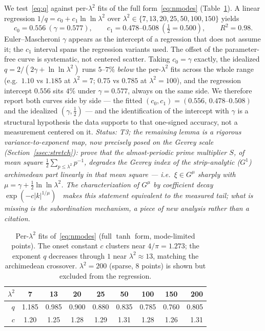 \documentclass[11pt,a4paper]{article}
\begin{document}
We test~\eqref{eq:q} against per-$\lambda^2$ fits of the full
form~\eqref{eq:nmodes} (Table~\ref{tab:q}). A linear regression
$1/q=c_0+c_1\ln\ln\lambda^2$ over $\lambda^2\in\{7,13,20,25,50,100,150\}$ yields
\[
  c_0=0.556\ (\gamma=0.577),\qquad c_1=0.478\text{--}0.508\ (\tfrac12=0.500),
  \qquad R^2=0.98 .
\]
Euler--Mascheroni $\gamma$ appears as the intercept of a regression that does
not assume it; the $c_1$ interval spans the regression variants used. The
offset of the parameter-free curve is systematic, not centered scatter.
Taking $c_0=\gamma$ exactly,
the idealized $q=2/(2\gamma+\ln\ln\lambda^2)$ runs $5$--$7\%$ \emph{below} the
per-$\lambda^2$ fits across the whole range (e.g.\ $1.10$ vs $1.185$ at
$\lambda^2=7$; $0.75$ vs $0.785$ at $\lambda^2=100$), and the regression
intercept $0.556$ sits $4\%$ under $\gamma=0.577$, always on the same side. We
therefore report both curves side by side --- the fitted
$(c_0,c_1)=(0.556,\,0.478\text{--}0.508)$ and the idealized
$(\gamma,\tfrac12)$ --- and the identification of the intercept with $\gamma$
is a structural hypothesis the data supports to that one-signed accuracy, not
a measurement centered on it. \emph{Status: T3; the remaining lemma is a rigorous
variance-to-exponent map, now precisely posed on the Gevrey scale
(Section~\ref{ssec:stretch}): prove that the almost-periodic prime multiplier
$S$, of mean square $\tfrac12\sum_{p\le\lambda^2}p^{-1}$, degrades the Gevrey
index of the strip-analytic ($G^1$) archimedean part linearly in that mean
square --- i.e.\ $\xi\in G^{\mu}$ sharply with
$\mu=\gamma+\tfrac12\ln\ln\lambda^2$. The characterization of $G^{\mu}$ by
coefficient decay $\exp(-c|k|^{1/\mu})$~\cite{Rodino1993} makes this statement
equivalent to the measured tail; what is missing is the subordination
mechanism, a piece of new analysis rather than a citation.}

\begin{table}[t]
\centering
\caption{Per-$\lambda^2$ fits of~\eqref{eq:nmodes} (full $\tanh$ form,
mode-limited points). The onset constant $c$ clusters near $4/\pi=1.273$; the
exponent $q$ decreases through $1$ near $\lambda^2\approx13$, matching the
archimedean crossover. $\lambda^2=200$ (sparse, $8$ points) is shown but
excluded from the regression.}
\label{tab:q}
\begin{tabular}{@{}rccccccc r@{}}
\toprule
$\lambda^2$ & 7 & 13 & 20 & 25 & 50 & 100 & 150 & 200 \\
\midrule
$q$ & 1.185 & 0.985 & 0.900 & 0.880 & 0.835 & 0.785 & 0.760 & 0.805 \\
$c$ & 1.20 & 1.25 & 1.28 & 1.29 & 1.31 & 1.28 & 1.26 & 1.31 \\
\bottomrule
\end{tabular}
\end{table}
\end{document}
